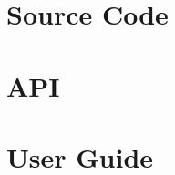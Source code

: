 \documentclass[12pt]{article}
\begin{document}
\begin{appendices}


\section{Source Code}


\newpage

\section{API}

\label{WebAPI}


\newpage

\section{User Guide}

\end{appendices}


\newpage
\printindex
\end{document}
